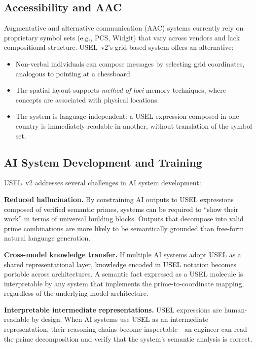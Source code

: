 \documentclass[11pt,a4paper]{article}
\begin{document}
\subsection{Accessibility and AAC}
\label{sec:accessibility}

Augmentative and alternative communication (AAC) systems currently rely on proprietary symbol sets (e.g., PCS, Widgit) that vary across vendors and lack compositional structure. USEL~v2's grid-based system offers an alternative:

\begin{itemize}[nosep]
    \item Non-verbal individuals can compose messages by selecting grid coordinates, analogous to pointing at a chessboard.
    \item The spatial layout supports \emph{method of loci} memory techniques, where concepts are associated with physical locations.
    \item The system is language-independent: a USEL expression composed in one country is immediately readable in another, without translation of the symbol set.
\end{itemize}

\subsection{AI System Development and Training}
\label{sec:ai-development}

USEL~v2 addresses several challenges in AI system development:

\textbf{Reduced hallucination.} By constraining AI outputs to USEL expressions composed of verified semantic primes, systems can be required to ``show their work'' in terms of universal building blocks. Outputs that decompose into valid prime combinations are more likely to be semantically grounded than free-form natural language generation.

\textbf{Cross-model knowledge transfer.} If multiple AI systems adopt USEL as a shared representational layer, knowledge encoded in USEL notation becomes portable across architectures. A semantic fact expressed as a USEL molecule is interpretable by any system that implements the prime-to-coordinate mapping, regardless of the underlying model architecture.

\textbf{Interpretable intermediate representations.} USEL expressions are human-readable by design. When AI systems use USEL as an intermediate representation, their reasoning chains become inspectable---an engineer can read the prime decomposition and verify that the system's semantic analysis is correct.
\end{document}

